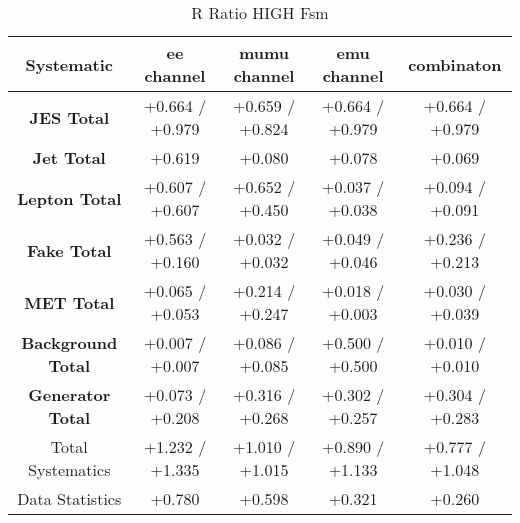 \begin{table}[htbp]
\scriptsize
  \begin{center} 
  \begin{tabular}{|c|c|c|c|c|}
  \hline
   Systematic                            &  ee channel&  mumu channel&  emu channel&  combinaton\\
 \hline
\textbf{JES Total}                    &+0.664   / +0.979   & +0.659   / +0.824   & +0.664   / +0.979   & +0.664   / +0.979  \\
\textbf{Jet Total}                    &+0.619              & +0.080              & +0.078              & +0.069             \\
\textbf{Lepton Total}                 &+0.607   / +0.607   & +0.652   / +0.450   & +0.037   / +0.038   & +0.094   / +0.091  \\
\textbf{Fake Total}                   &+0.563   / +0.160   & +0.032   / +0.032   & +0.049   / +0.046   & +0.236   / +0.213  \\
\textbf{MET Total}                    &+0.065   / +0.053   & +0.214   / +0.247   & +0.018   / +0.003   & +0.030   / +0.039  \\
\textbf{Background Total}             &+0.007   / +0.007   & +0.086   / +0.085   & +0.500   / +0.500   & +0.010   / +0.010  \\
\textbf{Generator Total}              &+0.073   / +0.208   & +0.316   / +0.268   & +0.302   / +0.257   & +0.304   / +0.283  \\
  \hline
  \hline
Total Systematics                     &+1.232   / +1.335   & +1.010   / +1.015   & +0.890   / +1.133   & +0.777   / +1.048  \\
Data Statistics                       &+0.780              & +0.598              & +0.321              & +0.260             \\
  \hline
  \end{tabular}
  \end{center} 
  \label{tab:fsm_nominal_rratio_high}
  \caption{R Ratio HIGH Fsm}
\end{table}

